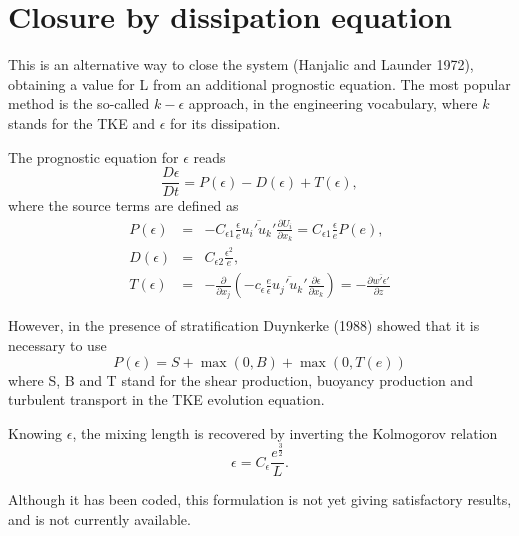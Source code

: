 \section{Closure by dissipation equation}

This is an alternative way to close the system (Hanjalic and Launder 1972),
obtaining a value for L from an additional prognostic equation. The most
popular method is the so-called $k-\epsilon$ approach, in the
engineering vocabulary, where $k$ stands for the TKE and $\epsilon$ for
its dissipation.

The prognostic equation for $\epsilon$ reads
\begin{equation}
\frac {D \epsilon}{D t}=P(\epsilon)-D(\epsilon) + T(\epsilon),
\end{equation}
where the source terms are defined as
\begin{eqnarray}
P(\epsilon)&=&-C_{\epsilon 1} \frac {\epsilon}{e} \overline{u_i' u_k'}
\frac{\partial U_i}{\partial x_k}=C_{\epsilon 1} \frac {\epsilon}{e}
P(e),\\
D(\epsilon)&=&C_{\epsilon 2} \frac {\epsilon ^2}{e},\\
T(\epsilon)&=&-\frac{\partial}{\partial x_j}
(-c_{\epsilon} \frac{e}{\epsilon} \overline{u_j' u_k'}
\frac{\partial \epsilon}{\partial x_k})=-\frac{\partial
\overline{w' \epsilon'}}{\partial z}
\end{eqnarray}

However, in the presence of stratification Duynkerke (1988) showed that
it is necessary to use
\begin{equation}
P(\epsilon)=S+\max(0,B)+\max(0,T(e))
\end{equation}
where S, B and T stand for the shear production, buoyancy production and
turbulent transport in the TKE evolution equation.\\
\nocite{Han_Laun72} \nocite{Duynkerke88}

Knowing $\epsilon$, the mixing length is recovered by inverting the
Kolmogorov relation
\begin{equation}
\epsilon=C_{\epsilon} \frac{e^{\frac{3}{2}}}{L}.
\end{equation}

Although it has been coded, this formulation is not yet giving satisfactory
results, and is not currently available.



